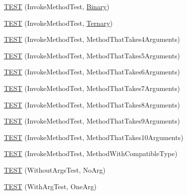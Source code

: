 \begin{DoxyCompactItemize}
\item 
\hyperlink{namespacetesting_1_1gmock__more__actions__test_a86221fa7d09853358e38c01b0d6ceced}{T\+E\+ST} (Invoke\+Method\+Test, \hyperlink{namespacetesting_1_1gmock__more__actions__test_a853c9f048674a60798b930750b74a1df}{Binary})
\item 
\hyperlink{namespacetesting_1_1gmock__more__actions__test_a2b98a8a68d37a0bec600227372a1cff8}{T\+E\+ST} (Invoke\+Method\+Test, \hyperlink{namespacetesting_1_1gmock__more__actions__test_ab98b352528a0b72625b4710a6fc648a1}{Ternary})
\item 
\hyperlink{namespacetesting_1_1gmock__more__actions__test_af0ab6ef9fdf48e8442a5579ab27eb517}{T\+E\+ST} (Invoke\+Method\+Test, Method\+That\+Takes4\+Arguments)
\item 
\hyperlink{namespacetesting_1_1gmock__more__actions__test_a512db122c5beadeeef026bb54aec7e45}{T\+E\+ST} (Invoke\+Method\+Test, Method\+That\+Takes5\+Arguments)
\item 
\hyperlink{namespacetesting_1_1gmock__more__actions__test_a715c088109e141aa577e497e3729b98b}{T\+E\+ST} (Invoke\+Method\+Test, Method\+That\+Takes6\+Arguments)
\item 
\hyperlink{namespacetesting_1_1gmock__more__actions__test_a1f11171c55d049143c980502213e0b11}{T\+E\+ST} (Invoke\+Method\+Test, Method\+That\+Takes7\+Arguments)
\item 
\hyperlink{namespacetesting_1_1gmock__more__actions__test_a5bfedd2255bbfe7ffcbc76ec581b2ff6}{T\+E\+ST} (Invoke\+Method\+Test, Method\+That\+Takes8\+Arguments)
\item 
\hyperlink{namespacetesting_1_1gmock__more__actions__test_acdcc7f6a35e6373f3d0b3a71f98c418b}{T\+E\+ST} (Invoke\+Method\+Test, Method\+That\+Takes9\+Arguments)
\item 
\hyperlink{namespacetesting_1_1gmock__more__actions__test_a14b55eb4c0d0b3149e269eea1443cb58}{T\+E\+ST} (Invoke\+Method\+Test, Method\+That\+Takes10\+Arguments)
\item 
\hyperlink{namespacetesting_1_1gmock__more__actions__test_adb0c29d688c079ad5bf07d5a0bd72aea}{T\+E\+ST} (Invoke\+Method\+Test, Method\+With\+Compatible\+Type)
\item 
\hyperlink{namespacetesting_1_1gmock__more__actions__test_a68748f21021e787dfdc095691c94d495}{T\+E\+ST} (Without\+Args\+Test, No\+Arg)
\item 
\hyperlink{namespacetesting_1_1gmock__more__actions__test_a40664c1acdc3650e8edf9a9a49b008de}{T\+E\+ST} (With\+Arg\+Test, One\+Arg)
\item 

\end{DoxyCompactItemize}
